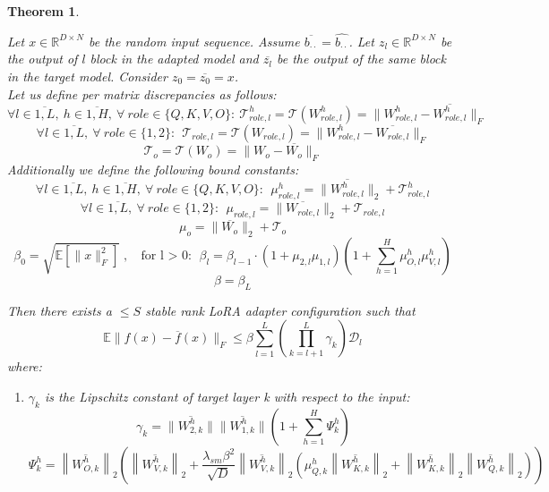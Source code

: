 \documentclass[a4paper,14pt]{extarticle}
\newtheorem{theorem}{Theorem}
\begin{document}
    \begin{theorem} $~$
    
        Let $x\in \mathbb{R}^{D\times N}$ be the random input sequence. Assume $\overline{b_{\cdot\cdot}} = \widehat{b_{\cdot\cdot}}$. Let $z_l\in \mathbb{R}^{D\times N}$ be the output of $l$ block in the adapted model and $\overline{z_l}$ be the output of the same block in the target model. Consider $z_0 = \overline{z_0} = x$. \\
        Let us define per matrix discrepancies as follows:
        $$\forall l\in\overline{1,L},~h\in\overline{1,H},~ \forall ~ role\in \{Q, K, V, O\}: ~\mathcal{T}_{role, l}^h =\mathcal{T}(W_{role, l}^h) = \|W_{role, l}^h - \overline{W_{role, l}^h}\|_F$$
        $$\forall l\in\overline{1,L},~ \forall ~ role \in \{1, 2\}: ~~\mathcal{T}_{role, l} =\mathcal{T}(W_{role, l}) = \|W_{role, l}^h - \overline{W_{role, l}}\|_F$$
        $$\mathcal{T}_o =\mathcal{T}(W_o) = \|W_o - \overline{W_o}\|_F$$
        Additionally we define the following bound constants:
        $$\forall l\in\overline{1,L},~h\in\overline{1,H},~ \forall ~ role\in \{Q, K, V, O\}: ~~\mu_{role, l}^h = \|\overline{W_{role, l}^h}\|_2 + \mathcal{T}_{role, l}^h$$
        $$\forall l\in\overline{1,L},~ \forall ~ role \in \{1, 2\}: ~~\mu_{role, l} = \|\overline{W_{role, l}}\|_2 + \mathcal{T}_{role, l}$$
        $$\mu_o = \|\overline{W_o}\|_2 + \mathcal{T}_o$$
        $$\beta_0 = \sqrt{\mathbb{E}[\|x\|^2_F]}\text{, $~~$ for l $>$ 0: } \beta_l=\beta_{l-1}\cdot (1+\mu_{2,l}\mu_{1,l})\left(1 + \sum\limits_{h=1}^H\mu_{O,l}^h\mu_{V,l}^h \right)$$
        $$\beta = \beta_L$$

        Then there exists a $\leq S$ stable rank LoRA adapter configuration such that
        $$\mathbb{E}\|f(x) - \overline{f}(x)\|_F \leqslant \beta\sum\limits_{l=1}^{L}\left(\prod\limits_{k=l+1}^L \gamma_k \right)\mathcal{D}_l $$
        where:

        \begin{enumerate}
            \item $\gamma_k$ is the Lipschitz constant of target layer k with respect to the input:
                $$\gamma_k = \|\overline{W_{2,k}^h}\|\|\overline{W_{1,k}^h}\|\left(1 + \sum\limits_{h=1}^H\Psi_k^h\right)$$
                $$ \Psi_k^h = \left\|\overline{W_{O,k}^h}\right\|_2 \!\left( \left\|\overline{W_{V,k}^h}\right\|_2 \!+\! \frac{\lambda_{sm} \beta^2}{\sqrt{D}} \left\|\overline{W_{V,k}^h}\right\|_2\!\left(\mu_{Q,k}^h \left\|\overline{W_{K,k}^h}\right\|_2 + \left\|\overline{W_{K,k}^h}\right\|_2 \left\|\overline{W_{Q,k}^h}\right\|_2\right)\!\!\right) $$


\end{enumerate}
\end{theorem}
\end{document}
